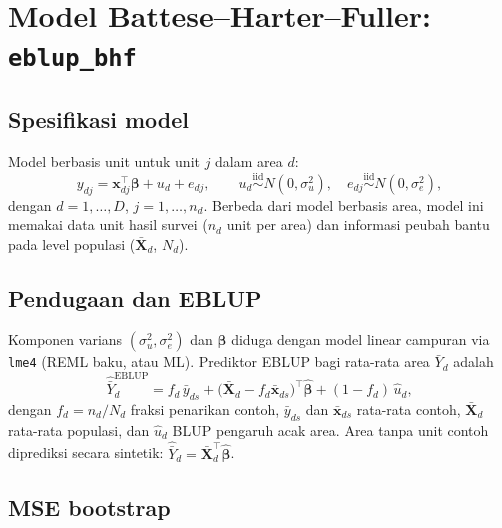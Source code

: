 \documentclass[11pt,a4paper]{article}
\theoremstyle{definition}
\begin{document}
\section{Model Battese--Harter--Fuller: \texttt{eblup\_bhf}}

\subsection{Spesifikasi model}

Model berbasis unit \cite{battese1988} untuk unit $j$ dalam area $d$:
\begin{equation}
  y_{dj} = \mathbf{x}_{dj}^{\top}\boldsymbol{\beta} + u_d + e_{dj},
  \qquad
  u_d \overset{\text{iid}}{\sim} N(0, \sigma_u^2), \quad
  e_{dj} \overset{\text{iid}}{\sim} N(0, \sigma_e^2),
  \label{eq:bhf}
\end{equation}
dengan $d = 1,\dots,D$, $j = 1,\dots,n_d$. Berbeda dari model berbasis area,
model ini memakai data unit hasil survei ($n_d$ unit per area) dan informasi
peubah bantu pada level populasi ($\bar{\mathbf{X}}_d$, $N_d$).

\subsection{Pendugaan dan EBLUP}

Komponen varians $(\sigma_u^2, \sigma_e^2)$ dan $\boldsymbol{\beta}$ diduga dengan
model linear campuran via \texttt{lme4} (REML baku, atau ML). Prediktor EBLUP bagi
rata-rata area $\bar{Y}_d$ adalah
\begin{equation}
  \hat{\bar{Y}}_d^{\mathrm{EBLUP}}
  = f_d\,\bar{y}_{ds}
    + \bigl(\bar{\mathbf{X}}_d - f_d\bar{\mathbf{x}}_{ds}\bigr)^{\top}\hat{\boldsymbol{\beta}}
    + (1 - f_d)\,\hat{u}_d,
  \label{eq:bhf-eblup}
\end{equation}
dengan $f_d = n_d/N_d$ fraksi penarikan contoh, $\bar{y}_{ds}$ dan
$\bar{\mathbf{x}}_{ds}$ rata-rata contoh, $\bar{\mathbf{X}}_d$ rata-rata populasi,
dan $\hat{u}_d$ BLUP pengaruh acak area. Area tanpa unit contoh diprediksi secara
sintetik: $\hat{\bar{Y}}_d = \bar{\mathbf{X}}_d^{\top}\hat{\boldsymbol{\beta}}$.

\subsection{MSE bootstrap}
\end{document}

